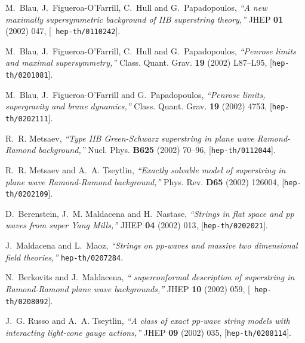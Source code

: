 \documentclass[a4paper,12pt]{article}
\numberwithin{equation}{section}
\begin{document}
\providecommand{\href}[2]{#2}\begingroup\raggedright\begin{thebibliography}{10}

M.~Blau, J.~Figueroa-O'Farrill, C.~Hull and G.~Papadopoulos, {\it ``A new
  maximally supersymmetric background of {IIB} superstring theory,''}  JHEP
  {\bf 01} (2002) 047, [\href{http://arXiv.org/abs/hep-th/0110242}{{\tt
  hep-th/0110242}}].

M.~Blau, J.~Figueroa-O'Farrill, C.~Hull and G.~Papadopoulos, {\it ``Penrose
  limits and maximal supersymmetry,''}  Class. Quant. Grav. {\bf 19} (2002)
  L87--L95, [\href{http://arXiv.org/abs/hep-th/0201081}{{\tt hep-th/0201081}}].

M.~Blau, J.~Figueroa-O'Farrill and G.~Papadopoulos, {\it ``Penrose limits,
  supergravity and brane dynamics,''}  Class. Quant. Grav. {\bf 19} (2002)
  4753, [\href{http://arXiv.org/abs/hep-th/0202111}{{\tt hep-th/0202111}}].

R.~R. Metsaev, {\it ``Type {IIB} {G}reen-{S}chwarz superstring in plane wave
  {R}amond-{R}amond background,''}  Nucl. Phys. {\bf B625} (2002) 70--96,
  [\href{http://arXiv.org/abs/hep-th/0112044}{{\tt hep-th/0112044}}].

R.~R. Metsaev and A.~A. Tseytlin, {\it ``Exactly solvable model of superstring
  in plane wave {R}amond-{R}amond background,''}  Phys. Rev. {\bf D65} (2002)
  126004, [\href{http://arXiv.org/abs/hep-th/0202109}{{\tt hep-th/0202109}}].

D.~Berenstein, J.~M. Maldacena and H.~Nastase, {\it ``Strings in flat space and
  pp waves from {\coordHE{}} super {Y}ang {M}ills,''}  JHEP {\bf 04} (2002) 013,
  [\href{http://arXiv.org/abs/hep-th/0202021}{{\tt hep-th/0202021}}].

J.~Maldacena and L.~Maoz, {\it ``Strings on pp-waves and massive two
  dimensional field theories,''}
  \href{http://arXiv.org/abs/hep-th/0207284}{{\tt hep-th/0207284}}.

N.~Berkovits and J.~Maldacena, {\it ``{\coordHE{}} superconformal description of
  superstring in {R}amond-{R}amond plane wave backgrounds,''}  JHEP {\bf 10}
  (2002) 059, [\href{http://arXiv.org/abs/hep-th/0208092}{{\tt
  hep-th/0208092}}].

J.~G. Russo and A.~A. Tseytlin, {\it ``A class of exact pp-wave string models
  with interacting light-cone gauge actions,''}  JHEP {\bf 09} (2002) 035,
  [\href{http://arXiv.org/abs/hep-th/0208114}{{\tt hep-th/0208114}}].


\end{thebibliography}
\end{document}
